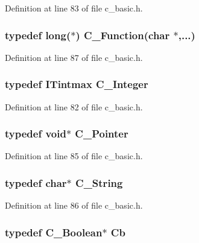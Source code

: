 Definition at line 83 of file c\_\-basic.h.
\subsubsection{\setlength{\rightskip}{0pt plus 5cm}typedef long($\ast$) \bf{C\_\-Function}(char $\ast$,...)}\label{c__basic_8h_344c40edeb9768096ece7fa286f0a7f5}




Definition at line 87 of file c\_\-basic.h.
\subsubsection{\setlength{\rightskip}{0pt plus 5cm}typedef \bf{ITintmax} \bf{C\_\-Integer}}\label{c__basic_8h_ce43fa10fafc1bdcb4f161db6347ea37}




Definition at line 82 of file c\_\-basic.h.
\subsubsection{\setlength{\rightskip}{0pt plus 5cm}typedef void$\ast$ \bf{C\_\-Pointer}}\label{c__basic_8h_ec7997e9f0e165d6fa96f5cc2aa9907d}




Definition at line 85 of file c\_\-basic.h.
\subsubsection{\setlength{\rightskip}{0pt plus 5cm}typedef char$\ast$ \bf{C\_\-String}}\label{c__basic_8h_7c49a3f376dcd06c279ccb3b40b9cfbc}




Definition at line 86 of file c\_\-basic.h.
\subsubsection{\setlength{\rightskip}{0pt plus 5cm}typedef \bf{C\_\-Boolean}$\ast$ \bf{Cb}}\label{c__basic_8h_bdff608da5eb1dc3220b25e0daa1d301}




